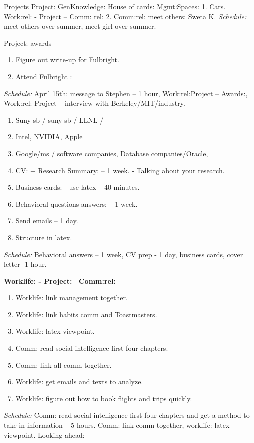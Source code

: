 \documentclass[serif, mathserif, final]{beamer}
\begin{document}
\begin{frame}
\begin{columns}
\begin{block}{Projects}
Project: GenKnowledge:  
House of cards: Mgmt:Spaces: 
1. Cars.  Work:rel: -  Project – Comm: rel: 
2. Comm:rel: meet others:  Sweta K. 
{\it Schedule:} meet others over summer, meet girl over summer. 

{Project: awards }  
\begin{enumerate} 
\tiny \item \tiny Figure out write-up for Fulbright. 
\item \tiny Attend Fulbright : 
\end{enumerate} 
\textit{Schedule:} April 15th: message to Stephen – 1 hour, Work:rel:Project – Awards:,  Work:rel: Project – interview with
Berkeley/MIT/industry. 

\begin{enumerate} 
\tiny \item \tiny Suny sb / suny sb / LLNL / 
\item \tiny Intel, NVIDIA, Apple
\item \tiny Google/ms / software companies, Database companies/Oracle,
\tiny \item \tiny CV: + Research Summary:  -- 1 week.  - Talking about
your research.
\item \tiny Business cards:  - use latex  -- 40 minutes.
\item \tiny Behavioral questions answers:    -- 1 week. 
\item \tiny Send emails – 1 day. 
\item \tiny Structure in latex. 
\end{enumerate}  
\textit{Schedule:} Behavioral answers – 1 week, CV prep - 1 day,
business cards, cover letter -1 hour.  

{\bf Worklife: - Project: –Comm:rel: } 
\begin{enumerate} 
\tiny \item \tiny Worklife: link management together.  
\item \tiny  Worklife: link habits comm and Toastmasters.
\item \tiny Worklife: latex viewpoint. 
\item \tiny Comm: read social intelligence first four chapters.
\item \tiny  Comm: link all comm together.
\item \tiny Worklife: get emails and texts to analyze. 
\item \tiny  Worklife: figure out how to book flights and trips quickly. 
\end{enumerate}
\textit{Schedule:}  Comm: read social intelligence first four chapters
and get a method to take in information – 5 hours. 
Comm: link comm together, worklife: latex viewpoint. 
Looking ahead: 


\end{block}
\end{columns}
\end{frame}
\end{document}
